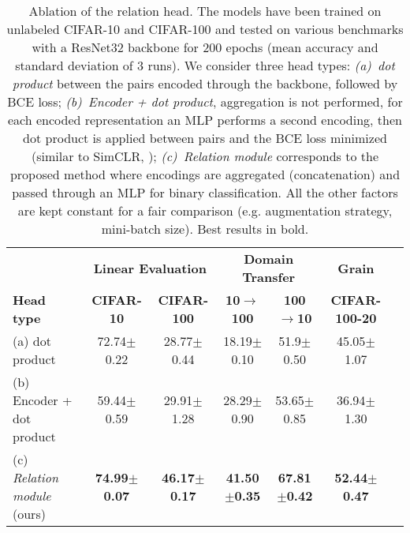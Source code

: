 \documentclass{article}
\begin{document}
\begin{table}[H]
 \caption{Ablation of the relation head. The models have been trained on unlabeled CIFAR-10 and CIFAR-100 and tested on various benchmarks with a ResNet32 backbone for 200 epochs (mean accuracy and standard deviation of 3 runs). We consider three head types: \emph{(a)~dot product} between the pairs encoded through the backbone, followed by BCE loss; \emph{(b)~Encoder + dot product}, aggregation is not performed, for each encoded representation an MLP performs a second encoding, then dot product is applied between pairs and the BCE loss minimized (similar to SimCLR, \citealt{chen2020simple}); \emph{(c)~Relation module} corresponds to the proposed method where encodings are aggregated (concatenation) and passed through an MLP for binary classification. All the other factors are kept constant for a fair comparison (e.g. augmentation strategy, mini-batch size). Best results in bold.}
 \label{tab:head_type}
 \begin{adjustbox}{width=0.75\columnwidth,center}
  \centering
  \begin{tabular}{lcccccc}
    \toprule
     & \multicolumn{2}{c}{\textbf{Linear Evaluation}} & \multicolumn{2}{c}{\textbf{Domain Transfer}} &
     \multicolumn{1}{c}{\textbf{Grain}}\\
    \cmidrule[0.1pt](r){2-3} \cmidrule[0.1pt](r){4-5} \cmidrule[0.1pt](l){6-6}
    \textbf{Head type} &
    \textbf{CIFAR-10} & \textbf{CIFAR-100} & \textbf{10}$\rightarrow$\textbf{100} & \textbf{100}$\rightarrow$\textbf{10} & \textbf{CIFAR-100-20}\\
    \midrule
    (a) dot product & 
    72.74$\pm$\small{0.22} & 28.77$\pm$\small{0.44} & 18.19$\pm$\small{0.10} & 51.9$\pm$\small{0.50} & 45.05$\pm$\small{1.07}\\
    (b) Encoder + dot product & 
    59.44$\pm$\small{0.59} & 29.91$\pm$\small{1.28} & 28.29$\pm$\small{0.90} & 53.65$\pm$\small{0.85} & 36.94$\pm$\small{1.30}\\
    (c) \emph{Relation module} (ours) & 
    \textbf{74.99$\pm$\small{0.07}} & \textbf{46.17$\pm$\small{0.17}} & \textbf{41.50$\pm$\small{0.35}} & \textbf{67.81$\pm$\small{0.42}} & \textbf{52.44$\pm$\small{0.47}}\\
    \bottomrule
  \end{tabular}
 \end{adjustbox}
\end{table}
\end{document}
